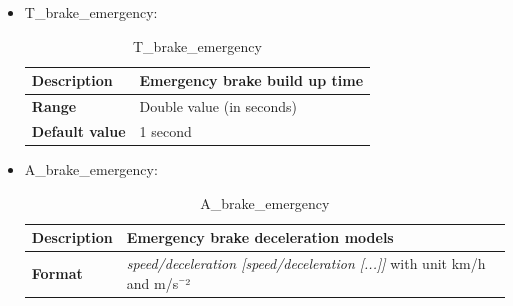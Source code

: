 		\begin{itemize}
			
			\item T\_brake\_emergency:
			\begin{longtable}{|l|l|}
				\caption{T\_brake\_emergency}\\
				\hline
				
					\begin{minipage}[t]{0.22\linewidth} \textbf{Description}	\end{minipage}
				&	\begin{minipage}[t]{0.78\linewidth} Emergency brake build up time \end{minipage} \\
				
				\hline
				
				\begin{minipage}[t]{0.22\linewidth} \textbf{Range}	\end{minipage}
				&	\begin{minipage}[t]{0.78\linewidth} Double value (in seconds) \end{minipage} \\
				
				\hline
				
				\begin{minipage}[t]{0.22\linewidth} \textbf{Default value}	\end{minipage}
				&	\begin{minipage}[t]{0.78\linewidth} 1 second \end{minipage} \\
				
				\hline
			\end{longtable}
		
			\item A\_brake\_emergency:
			\begin{longtable}{|l|l|}
				\caption{A\_brake\_emergency}\\
				\hline
				
				\begin{minipage}[t]{0.22\linewidth} \textbf{Description}	\end{minipage}
				&	\begin{minipage}[t]{0.78\linewidth} Emergency brake deceleration models \end{minipage} \\
				
				\hline
				
				\begin{minipage}[t]{0.22\linewidth} \textbf{Format}	\end{minipage}
				&	\begin{minipage}[t]{0.78\linewidth} \textit{speed/deceleration [speed/deceleration [...]]}  with unit km/h and m/s¯²\end{minipage} \\
					

\end{longtable}
\end{itemize}
